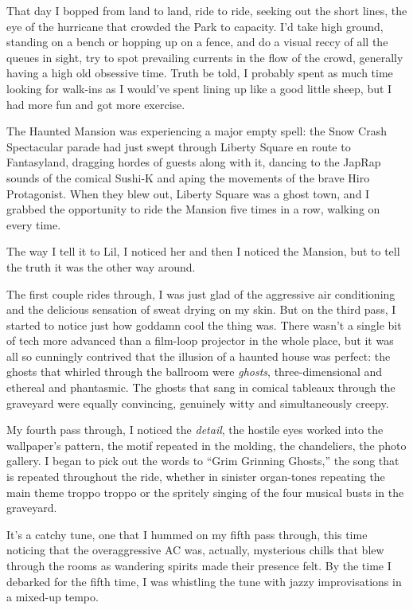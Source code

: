 That day I bopped from land to land, ride to ride, seeking out the
short lines, the eye of the hurricane that crowded the Park to
capacity. I'd take high ground, standing on a bench or hopping up
on a fence, and do a visual reccy of all the queues in sight, try
to spot prevailing currents in the flow of the crowd, generally
having a high old obsessive time. Truth be told, I probably spent
as much time looking for walk-ins as I would've spent lining up
like a good little sheep, but I had more fun and got more
exercise.

The Haunted Mansion was experiencing a major empty spell: the Snow
Crash Spectacular parade had just swept through Liberty Square en
route to Fantasyland, dragging hordes of guests along with it,
dancing to the JapRap sounds of the comical Sushi-K and aping the
movements of the brave Hiro Protagonist. When they blew out,
Liberty Square was a ghost town, and I grabbed the opportunity to
ride the Mansion five times in a row, walking on every time.

The way I tell it to Lil, I noticed her and then I noticed the
Mansion, but to tell the truth it was the other way around.

The first couple rides through, I was just glad of the aggressive
air conditioning and the delicious sensation of sweat drying on my
skin. But on the third pass, I started to notice just how goddamn
cool the thing was. There wasn't a single bit of tech more advanced
than a film-loop projector in the whole place, but it was all so
cunningly contrived that the illusion of a haunted house was
perfect: the ghosts that whirled through the ballroom were
\emph{ghosts}, three-dimensional and ethereal and phantasmic. The
ghosts that sang in comical tableaux through the graveyard were
equally convincing, genuinely witty and simultaneously creepy.

My fourth pass through, I noticed the \emph{detail}, the hostile
eyes worked into the wallpaper's pattern, the motif repeated in the
molding, the chandeliers, the photo gallery. I began to pick out
the words to “Grim Grinning Ghosts,” the song that is repeated
throughout the ride, whether in sinister organ-tones repeating the
main theme troppo troppo or the spritely singing of the four
musical busts in the graveyard.

It's a catchy tune, one that I hummed on my fifth pass through,
this time noticing that the overaggressive AC was, actually,
mysterious chills that blew through the rooms as wandering spirits
made their presence felt. By the time I debarked for the fifth
time, I was whistling the tune with jazzy improvisations in a
mixed-up tempo.

